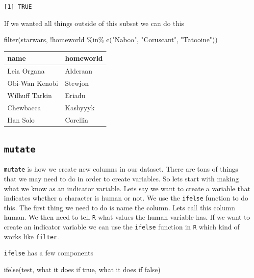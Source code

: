 \documentclass[
  letterpaper,
  DIV=11,
  numbers=noendperiod,
  oneside]{scrreprt}
\newenvironment{Shaded}{\begin{snugshade}}{\end{snugshade}}
\newcommand{\ControlFlowTok}[1]{\textcolor[rgb]{0.00,0.23,0.31}{#1}}
\newcommand{\FunctionTok}[1]{\textcolor[rgb]{0.28,0.35,0.67}{#1}}
\newcommand{\NormalTok}[1]{\textcolor[rgb]{0.00,0.23,0.31}{#1}}
\newcommand{\SpecialCharTok}[1]{\textcolor[rgb]{0.37,0.37,0.37}{#1}}
\newcommand{\StringTok}[1]{\textcolor[rgb]{0.13,0.47,0.30}{#1}}
\begin{document}
\begin{verbatim}
[1] TRUE
\end{verbatim}

If we wanted all things outside of this subset we can do this

\begin{Shaded}
\begin{Highlighting}[]
\FunctionTok{filter}\NormalTok{(starwars, }\SpecialCharTok{!}\NormalTok{homeworld }\SpecialCharTok{\%in\%} \FunctionTok{c}\NormalTok{(}\StringTok{"Naboo"}\NormalTok{, }\StringTok{"Coruscant"}\NormalTok{, }\StringTok{"Tatooine"}\NormalTok{))}
\end{Highlighting}
\end{Shaded}

\begin{tabular}{l|l}
\hline
name & homeworld\\
\hline
Leia Organa & Alderaan\\
\hline
Obi-Wan Kenobi & Stewjon\\
\hline
Wilhuff Tarkin & Eriadu\\
\hline
Chewbacca & Kashyyyk\\
\hline
Han Solo & Corellia\\
\hline
\end{tabular}

\hypertarget{mutate}{%
\subsection{\texorpdfstring{\texttt{mutate}}{mutate}}\label{mutate}}

\texttt{mutate} is how we create new columns in our dataset. There are
tons of things that we may need to do in order to create variables. So
lets start with making what we know as an indicator variable. Lets say
we want to create a variable that indicates whether a character is human
or not. We use the \texttt{ifelse} function to do this. The first thing
we need to do is name the column. Lets call this column human. We then
need to tell \texttt{R} what values the human variable has. If we want
to create an indicator variable we can use the \texttt{ifelse} function
in \texttt{R} which kind of works like \texttt{filter}.

\texttt{ifelse} has a few components

\begin{Shaded}
\begin{Highlighting}[]
\FunctionTok{ifelse}\NormalTok{(test, what it does }\ControlFlowTok{if}\NormalTok{ true, what it does }\ControlFlowTok{if}\NormalTok{ false)}
\end{Highlighting}
\end{Shaded}
\end{document}
